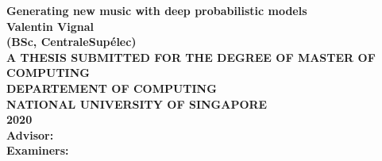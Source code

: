 \documentclass[12pt]{report}
\begin{document}
\pagestyle{empty}
\setlength{\parindent}{0cm}
\begin{center}
    {\textbf{\Large Generating new music with deep probabilistic models}}\\
    \vspace{2cm}
    {\textbf{\Large Valentin Vignal}}\\
    \textbf{(BSc, CentraleSupélec)}\\
    \vspace{2cm}
   {\textbf{\Large A THESIS SUBMITTED FOR THE DEGREE OF MASTER OF COMPUTING\\ DEPARTEMENT OF COMPUTING\\ NATIONAL UNIVERSITY OF SINGAPORE\\}}
    \vspace{2.5cm}
    {\textbf{\Large 2020}}\\
    \vspace{2.5cm}
    {\textbf{\large Advisor:}}\\
    {\textbf{\large Examiners: }}
\end{center}
\newpage


% 
%
% 
\end{document}
